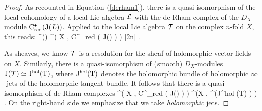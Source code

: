 \documentclass[11pt]{amsart}
\numberwithin{equation}{section}
\def\jet{{\rm J}}
\def\tangent{{\rm T}}
\begin{document}
\begin{proof}
As recounted in Equation (\ref{derham1}), there is a quasi-isomorphism of the local cohomology of a local Lie algebra $\mathcal L$ with the de Rham complex of the $D_X$-module ${\rm C}^\bu_{\rm red} (\jet (L))$.
Applied to the local Lie algebra $\mathcal T$ on the complex $n$-fold $X$, this reads:
\beqn
\cloc^\bu(\cT) \; \simeq \; \Omega^\bu \bigg( X \; , \; {\rm C}^\bu_{\rm red} \left( \jet (\cT) \right) \bigg) [2n] .
\eeqn





As sheaves, we know $\mathcal T$ is a resolution for the sheaf of holomorphic vector fields on $X$. 
Similarly, there is a quasi-isomorphism of (smooth) $D_X$-modules $\jet(\cT) \simeq \jet^{\rm hol} (\tangent)$, where $\jet^{\rm hol}(\tangent)$ denotes the holomorphic bundle of holomorphic $\infty$-jets of the holomorphic tangent bundle. 
It follows that there is a quasi-isomorphism of de Rham complexes
\beqn\label{smoothhol}
\Omega^\bu \bigg( X \; , \; {\rm C}^\bu_{\rm red} \left( \jet (\cT) \right) \bigg) \; \simeq \; \Omega^\bu \bigg(X \; , \; \cred^\bu\left(\jet^{\rm hol} (\tangent) \right) \bigg) .
\eeqn
On the right-hand side we emphasize that we take {\em holomorphic} jets.


\end{proof}
\end{document}
